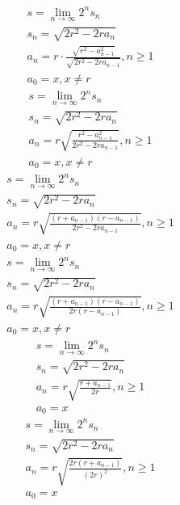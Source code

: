 \documentclass[a4paper,12pt]{report}
\begin{document}
\begin{subequations}
\begin{gather}
s = \lim \limits_{n \to \infty} 2^n s_n \\
s_n = \sqrt{2r^2 - 2ra_n} \\
a_n = r \cdot \frac{\sqrt{r^2 - a_{n-1}^2}}{\sqrt{2r^2 - 2ra_{n-1}}}, n \geq 1 \\
a_0 = x, x \neq r
\end{gather}
\end{subequations}
\begin{subequations}
\begin{gather}
s = \lim \limits_{n \to \infty} 2^n s_n \\
s_n = \sqrt{2r^2 - 2ra_n} \\
a_n = r \sqrt{\frac{r^2 - a_{n-1}^2}{2r^2 - 2ra_{n-1}}}, n \geq 1 \\
a_0 = x, x \neq r
\end{gather}
\end{subequations}
\begin{subequations}
\begin{gather}
s = \lim \limits_{n \to \infty} 2^n s_n \\
s_n = \sqrt{2r^2 - 2ra_n} \\
a_n = r \sqrt{\frac{(r + a_{n-1}) (r - a_{n-1})}{2r^2 - 2ra_{n-1}}}, n \geq 1 \\
a_0 = x, x \neq r
\end{gather}
\end{subequations}
\begin{subequations}
\begin{gather}
s = \lim \limits_{n \to \infty} 2^n s_n \\
s_n = \sqrt{2r^2 - 2ra_n} \\
a_n = r \sqrt{\frac{(r + a_{n-1}) (r - a_{n-1})}{2r (r - a_{n-1})}}, n \geq 1 \\
a_0 = x, x \neq r
\end{gather}
\end{subequations}
\begin{subequations}
\begin{gather}
s = \lim \limits_{n \to \infty} 2^n s_n \\
s_n = \sqrt{2r^2 - 2ra_n} \\
a_n = r \sqrt{\frac{r + a_{n-1}}{2r}}, n \geq 1 \\
a_0 = x
\end{gather}
\end{subequations}
\begin{subequations}
\begin{gather}
s = \lim \limits_{n \to \infty} 2^n s_n \\
s_n = \sqrt{2r^2 - 2ra_n} \\
a_n = r \sqrt{\frac{2r (r + a_{n-1})}{(2r)^2}}, n \geq 1 \\
a_0 = x
\end{gather}
\end{subequations}
\end{document}
